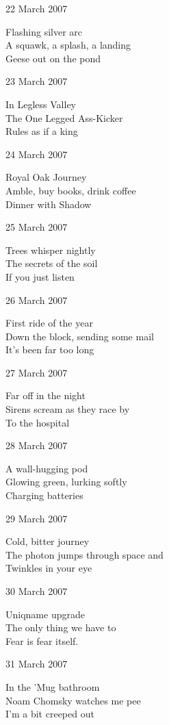 \documentclass[12pt]{article}
\begin{document}
22 March 2007

Flashing silver arc \\
A squawk, a splash, a landing \\
Geese out on the pond

23 March 2007

In Legless Valley \\
The One Legged Ass-Kicker \\
Rules as if a king

24 March 2007

Royal Oak Journey \\
Amble, buy books, drink coffee \\
Dinner with Shadow

25 March 2007

Trees whisper nightly \\
The secrets of the soil \\
If you just listen

\newpage

26 March 2007

First ride of the year \\
Down the block, sending some mail \\
It's been far too long

27 March 2007

Far off in the night \\
Sirens scream as they race by \\
To the hospital

28 March 2007

A wall-hugging pod \\
Glowing green, lurking softly \\
Charging batteries

29 March 2007

Cold, bitter journey \\
The photon jumps through space and \\
Twinkles in your eye

30 March 2007

Uniqname upgrade \\
The only thing we have to  \\
Fear is fear itself.

31 March 2007

In the 'Mug bathroom \\
Noam Chomsky watches me pee \\
I'm a bit creeped out


\newpage
\end{document}
